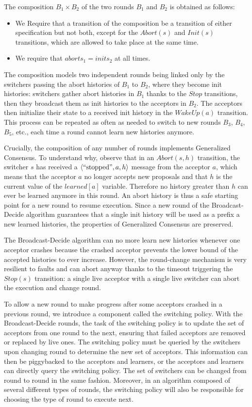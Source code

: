 \documentclass{llncs}
\begin{document}
The composition $B_1\times B_2$ of the two rounds $B_1$ and $B_2$ is obtained as follows:
\begin{itemize}
  \item We Require that a transition of the composition be a transition of either specification but not both, except for the $Abort\left( s \right)$ and $Init\left( s \right)$ transitions, which are allowed to take place at the same time. 
  \item We require that $aborts_1 = inits_2$ at all times.
\end{itemize}
The composition models two independent rounds being linked only by the switchers passing the abort histories of $B_1$ to $B_2$, where they become init histories: switchers gather abort histories in $B_1$ thanks to the $Stop$ transitions, then they broadcast them as init histories to the acceptors in $B_2$. The acceptors then initialize their state to a received init history in the $WakeUp\left( a \right)$ transition.
This process can be repeated as often as needed to switch to new rounds $B_3$, $B_4$, $B_5$, etc., each time a round cannot learn new histories anymore.

Crucially, the composition of any number of rounds implements Generalized Consensus.  To understand why, observe that in an $Abort\left( s,h \right)$ transition, the switcher $s$ has received a $\left\langle\text{``stopped''},a,h\right\rangle$ message from the acceptor $a$, which means that the acceptor $a$ no longer accepts new proposals and that $h$ is the current value of the $learned\left[ a \right]$ variable. Therefore no history greater than $h$ can ever be learned anymore in this round. An abort history is thus a safe
starting point for a new round to resume execution. Since a new round of the Broadcast-Decide algorithm guarantees that a single init history will be used as a prefix a new learned histories, the properties of Generalized Consensus are preserved. 

The Broadcast-Decide algorithm can no more learn new histories whenever one acceptor crashes because the crashed acceptor prevents the lower bound of the accepted histories to ever increase. However, the round-change mechanism is very resilient to faults and can abort anyway thanks to the timeout triggering the $Stop\left( s \right)$ transition: a single live acceptor with a single live switcher can abort the execution and change round.

To allow a new round to make progress after some acceptors crashed in a previous round, we introduce a component called the switching policy. With the Broadcast-Decide rounds, the task of the switching policy is to update the set of acceptors from one round to the next, ensuring that failed acceptors are removed or replaced by live ones. The switching policy must be queried by the switchers upon changing round to determine the new set of acceptors. This information can then be piggybacked to the
acceptors and learners, or the acceptors and learners can directly query the switching policy. 
The set of switchers can be changed from round to round in the same fashion. Moreover, in an algorithm composed of several different types of rounds, the switching policy will also be responsible for choosing the type of round to execute next.
\end{document}
